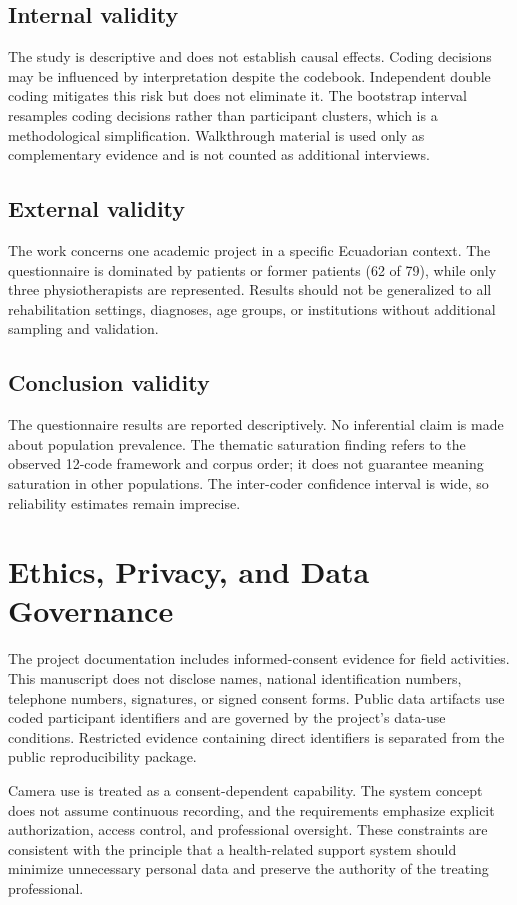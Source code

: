 \documentclass[pdflatex,sn-basic]{sn-jnl}
\begin{document}
\subsection{Internal validity}
The study is descriptive and does not establish causal effects. Coding decisions may be influenced by interpretation despite the codebook. Independent double coding mitigates this risk but does not eliminate it. The bootstrap interval resamples coding decisions rather than participant clusters, which is a methodological simplification. Walkthrough material is used only as complementary evidence and is not counted as additional interviews.

\subsection{External validity}
The work concerns one academic project in a specific Ecuadorian context. The questionnaire is dominated by patients or former patients (62 of 79), while only three physiotherapists are represented. Results should not be generalized to all rehabilitation settings, diagnoses, age groups, or institutions without additional sampling and validation.

\subsection{Conclusion validity}
The questionnaire results are reported descriptively. No inferential claim is made about population prevalence. The thematic saturation finding refers to the observed 12-code framework and corpus order; it does not guarantee meaning saturation in other populations. The inter-coder confidence interval is wide, so reliability estimates remain imprecise.

\section{Ethics, Privacy, and Data Governance}
The project documentation includes informed-consent evidence for field activities. This manuscript does not disclose names, national identification numbers, telephone numbers, signatures, or signed consent forms. Public data artifacts use coded participant identifiers and are governed by the project's data-use conditions. Restricted evidence containing direct identifiers is separated from the public reproducibility package.

Camera use is treated as a consent-dependent capability. The system concept does not assume continuous recording, and the requirements emphasize explicit authorization, access control, and professional oversight. These constraints are consistent with the principle that a health-related support system should minimize unnecessary personal data and preserve the authority of the treating professional.
\end{document}
